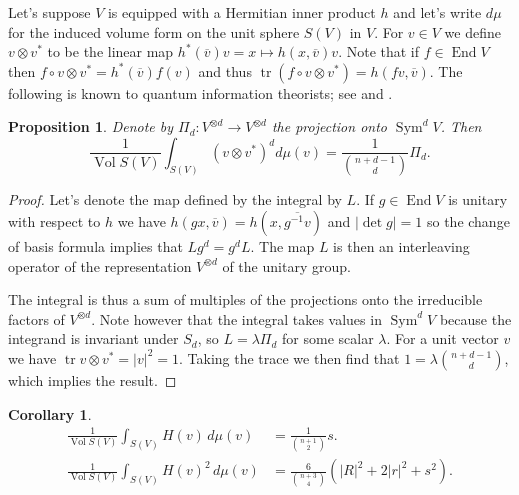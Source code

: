 \documentclass[10pt,a4paper]{amsart}
\newtheorem{prop}[theo]{Proposition}
\newtheorem{coro}[theo]{Corollary}
\theoremstyle{definition}
\def\ov#1{\overline{#1}}
\DeclareMathOperator{\Sym}{Sym}
\DeclareMathOperator{\tr}{tr}
\DeclareMathOperator{\Vol}{Vol}
\DeclareMathOperator{\End}{End}
\begin{document}
Let's suppose $V$ is equipped with a Hermitian inner product $h$
and let's write $d\mu$ for the induced volume form on the unit sphere $S(V)$ in
$V$. For $v \in V$ we define $v \otimes v^*$ to be the linear map
$h^*(\ov v) v = x \mapsto h(x, \ov v) v$.
Note that if $f \in \End V$ then $f \circ v \otimes v^* = h^*(\ov v) f(v)$
and thus $\tr(f \circ v \otimes v^*) = h(fv, \ov v)$.
The following is known to quantum information theorists; see
\cite{harrow2013church} and \cite[Chapter~7]{watrous2018theory}.

\begin{prop}
\label{prop:int-id}
Denote by $\Pi_d : V^{\otimes d} \to V^{\otimes d}$ the projection onto $\Sym^d V$.
Then
$$
\frac{1}{\Vol S(V)}
\int_{S(V)} (v \otimes v^*)^{d} d\mu(v)
= \frac{1}{\binom{n+d-1}{d}} \Pi_d.
$$
\end{prop}

\begin{proof}
Let's denote the map defined by the integral by $L$. If $g \in \End V$ is
unitary with respect to $h$ we have $h(g x, \ov v) = h(x, \ov{g^{-1} v})$ and
$|\!\det g| = 1$ so the change of basis formula implies that $L g^d = g^d L$.
The map $L$ is then an interleaving operator of the representation $V^{\otimes d}$
of the unitary group.

The integral is thus a sum of multiples of the projections onto the irreducible
factors of $V^{\otimes d}$.
Note however that the integral takes values in $\Sym^d V$ because the integrand
is invariant under $S_d$, so $L = \lambda \Pi_d$ for some scalar $\lambda$.
For a unit vector $v$ we have $\tr v \otimes v^* = |v|^2 = 1$.
Taking the trace we then find that $1 = \lambda \binom{n+d-1}{d}$,
which implies the result.
\end{proof}


\begin{coro}
\begin{align*}
\frac{1}{\Vol S(V)} \int_{S(V)}
\!\!\!
H(v) \, d\mu(v)
&= \frac{1}{\binom{n+1}{2}} s.
\\
\frac{1}{\Vol S(V)} \int_{S(V)}
\!\!\!
H(v)^2 \, d\mu(v)
&=
\frac{6}{\binom{n+3}4} (|R|^2 + 2|r|^2 + s^2).
\end{align*}
\end{coro}
\end{document}
